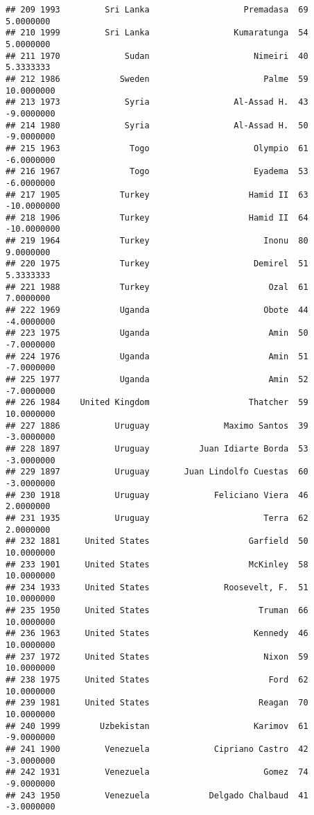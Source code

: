 \documentclass[
]{article}
\begin{document}
\begin{verbatim}
## 209 1993         Sri Lanka                   Premadasa  69    5.0000000
## 210 1999         Sri Lanka                 Kumaratunga  54    5.0000000
## 211 1970             Sudan                     Nimeiri  40    5.3333333
## 212 1986            Sweden                       Palme  59   10.0000000
## 213 1973             Syria                 Al-Assad H.  43   -9.0000000
## 214 1980             Syria                 Al-Assad H.  50   -9.0000000
## 215 1963              Togo                     Olympio  61   -6.0000000
## 216 1967              Togo                     Eyadema  53   -6.0000000
## 217 1905            Turkey                    Hamid II  63  -10.0000000
## 218 1906            Turkey                    Hamid II  64  -10.0000000
## 219 1964            Turkey                       Inonu  80    9.0000000
## 220 1975            Turkey                     Demirel  51    5.3333333
## 221 1988            Turkey                        Ozal  61    7.0000000
## 222 1969            Uganda                       Obote  44   -4.0000000
## 223 1975            Uganda                        Amin  50   -7.0000000
## 224 1976            Uganda                        Amin  51   -7.0000000
## 225 1977            Uganda                        Amin  52   -7.0000000
## 226 1984    United Kingdom                    Thatcher  59   10.0000000
## 227 1886           Uruguay               Maximo Santos  39   -3.0000000
## 228 1897           Uruguay          Juan Idiarte Borda  53   -3.0000000
## 229 1897           Uruguay       Juan Lindolfo Cuestas  60   -3.0000000
## 230 1918           Uruguay             Feliciano Viera  46    2.0000000
## 231 1935           Uruguay                       Terra  62    2.0000000
## 232 1881     United States                    Garfield  50   10.0000000
## 233 1901     United States                    McKinley  58   10.0000000
## 234 1933     United States               Roosevelt, F.  51   10.0000000
## 235 1950     United States                      Truman  66   10.0000000
## 236 1963     United States                     Kennedy  46   10.0000000
## 237 1972     United States                       Nixon  59   10.0000000
## 238 1975     United States                        Ford  62   10.0000000
## 239 1981     United States                      Reagan  70   10.0000000
## 240 1999        Uzbekistan                     Karimov  61   -9.0000000
## 241 1900         Venezuela             Cipriano Castro  42   -3.0000000
## 242 1931         Venezuela                       Gomez  74   -9.0000000
## 243 1950         Venezuela            Delgado Chalbaud  41   -3.0000000

\end{verbatim}
\end{document}
